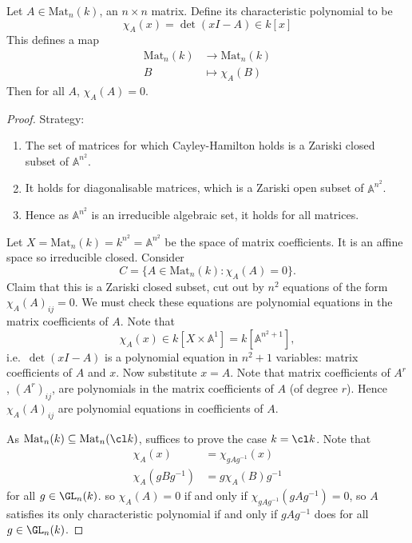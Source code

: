 \documentclass[a4paper]{article}
\renewcommand{\A}{\mathbb{A}}
\begin{document}
\begin{application}
  Let \(A \in \text{Mat}_n(k)\), an \(n \times n\) matrix. Define its characteristic polynomial to be
  \[
    \chi_A(x) = \det(xI - A) \in k[x]
  \]
  This defines a map
  \begin{align*}
    \text{Mat}_n(k) &\to \text{Mat}_n(k) \\
    B &\mapsto \chi_A(B)
  \end{align*}
  Then for all \(A\), \(\chi_A(A) = 0\).

\begin{proof}
  Strategy:
  \begin{enumerate}
  \item The set of matrices for which Cayley-Hamilton holds is a Zariski closed subset of \(\A^{n^2}\).
  \item It holds for diagonalisable matrices, which is a Zariski open subset of \(\A^{n^2}\).
  \item Hence as \(\A^{n^2}\) is an irreducible algebraic set, it holds for all matrices.
  \end{enumerate}

  Let \(X = \text{Mat}_n(k) = k^{n^2} = \A^{n^2}\) be the space of matrix coefficients. It is an affine space so irreducible closed. Consider
  \[
    C = \{A \in \text{Mat}_n(k): \chi_A(A) = 0\}.
  \]
  Claim that this is a Zariski closed subset, cut out by \(n^2\) equations of the form \(\chi_A(A)_{ij} = 0\). We must check these equations are polynomial equations in the matrix coefficients of \(A\). Note that
  \[
    \chi_A(x) \in k[X \times \A^1] = k[\A^{n^2 + 1}],
  \]
  i.e.\ \(\det (xI - A)\) is a polynomial equation in \(n^2 + 1\) variables: matrix coefficients of \(A\) and \(x\). Now substitute \(x = A\). Note that matrix coefficients of \(A^r\), \((A^r)_{ij}\), are polynomials in the matrix coefficients of \(A\) (of degree \(r\)). Hence \(\chi_A(A)_{ij}\) are polynomial equations in coefficients of \(A\).

  As \(\text{Mat}_n(k) \subseteq \text{Mat}_n(\cl k)\), suffices to prove the case \(k = \cl k\). Note that
  \begin{align*}
    \chi_A(x) &= \chi_{gAg^{-1}}(x) \\
    \chi_A(gBg^{-1}) &= g \chi_A(B) g^{-1}
  \end{align*}
  for all \(g \in \GL_n(k)\). so \(\chi_A(A) = 0\) if and only if \(\chi_{gAg^{-1}} (gAg^{-1}) = 0\), so \(A\) satisfies its only characteristic polynomial if and only if \(gAg^{-1}\) does for all \(g \in \GL_n(k)\).


\end{proof}
\end{application}
\end{document}
